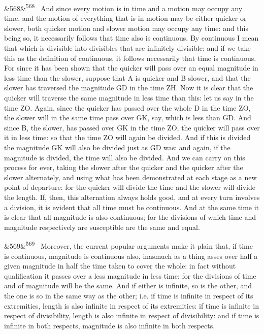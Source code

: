 \documentclass[12pt]{article}
\newcommand{\para}[1][]{\par\noindent\ifx&#1&\else\textsuperscript{\footnotesize #1}~\fi}
\begin{document}
\para[568] And since every motion is in time and a motion may occupy any time, and the motion of everything that is in motion may be either quicker or slower, both quicker motion and slower motion may occupy any time: and this being so, it necessarily follows that time also is continuous. By continuous I mean that which is divisible into divisibles that are infinitely divisible: and if we take this as the definition of continuous, it follows necessarily that time is continuous. For since it has been shown that the quicker will pass over an equal magnitude in less time than the slower, suppose that A is quicker and B slower, and that the slower has traversed the magnitude GD in the time ZH. Now it is clear that the quicker will traverse the same magnitude in less time than this: let us say in the time ZO. Again, since the quicker has passed over the whole D in the time ZO, the slower will in the same time pass over GK, say, which is less than GD. And since B, the slower, has passed over GK in the time ZO, the quicker will pass over it in less time: so that the time ZO will again be divided. And if this is divided the magnitude GK will also be divided just as GD was: and again, if the magnitude is divided, the time will also be divided. And we can carry on this process for ever, taking the slower after the quicker and the quicker after the slower alternately, and using what has been demonstrated at each stage as a new point of departure: for the quicker will divide the time and the slower will divide the length. If, then, this alternation always holds good, and at every turn involves a division, it is evident that all time must be continuous. And at the same time it is clear that all magnitude is also continuous; for the divisions of which time and magnitude respectively are susceptible are the same and equal.

\para[569] Moreover, the current popular arguments make it plain that, if time is continuous, magnitude is continuous also, inasmuch as a thing asses over half a given magnitude in half the time taken to cover the whole: in fact without qualification it passes over a less magnitude in less time; for the divisions of time and of magnitude will be the same. And if either is infinite, so is the other, and the one is so in the same way as the other; i.e. if time is infinite in respect of its extremities, length is also infinite in respect of its extremities: if time is infinite in respect of divisibility, length is also infinite in respect of divisibility: and if time is infinite in both respects, magnitude is also infinite in both respects.
\end{document}
